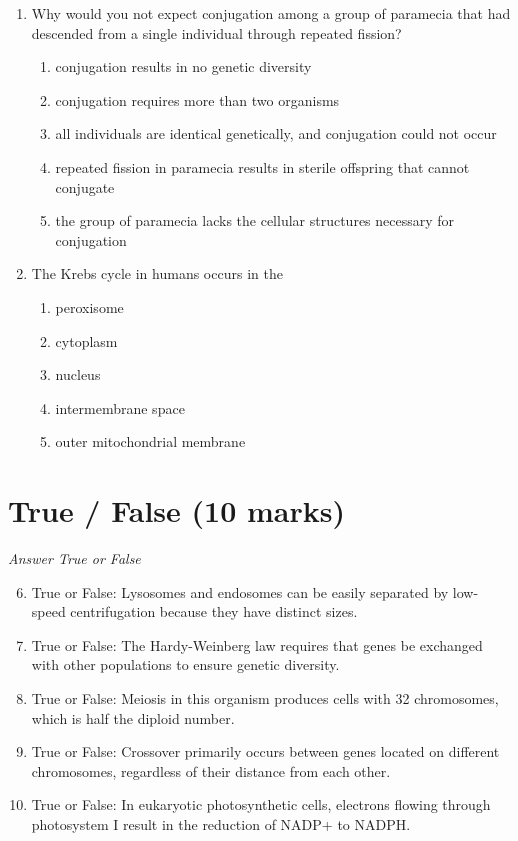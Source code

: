 \documentclass[12pt]{article}
\begin{document}
\begin{enumerate}[label=\arabic*.]
\begin{enumerate}[label=(\alph*)]
    \item Courtship is necessary for physical transformation required for reproduction
\end{enumerate}
\item Why would you not expect conjugation among a group of paramecia that had descended from a single individual through repeated fission?
\begin{enumerate}[label=(\alph*)]
    \item conjugation results in no genetic diversity
    \item conjugation requires more than two organisms
    \item all individuals are identical genetically, and conjugation could not occur
    \item repeated fission in paramecia results in sterile offspring that cannot conjugate
    \item the group of paramecia lacks the cellular structures necessary for conjugation
\end{enumerate}
\item The Krebs cycle in humans occurs in the
\begin{enumerate}[label=(\alph*)]
    \item peroxisome
    \item cytoplasm
    \item nucleus
    \item intermembrane space
    \item outer mitochondrial membrane
\end{enumerate}
\end{enumerate}

\section*{True / False (10 marks)}
\textit{Answer True or False}
\begin{enumerate}[label=\arabic*.]
\setcounter{enumi}{5}
\item True or False: Lysosomes and endosomes can be easily separated by low-speed centrifugation because they have distinct sizes.
\item True or False: The Hardy-Weinberg law requires that genes be exchanged with other populations to ensure genetic diversity.
\item True or False: Meiosis in this organism produces cells with 32 chromosomes, which is half the diploid number.
\item True or False: Crossover primarily occurs between genes located on different chromosomes, regardless of their distance from each other.
\item True or False: In eukaryotic photosynthetic cells, electrons flowing through photosystem I result in the reduction of NADP+ to NADPH.
\end{enumerate}
\end{document}
